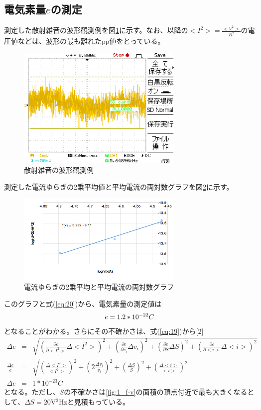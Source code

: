 \documentclass[11pt,a4j]{jsarticle}
\begin{document}
   \subsection{電気素量$e$の測定}
   
   測定した散射雑音の波形観測例を図\ref{fig:wave2}に示す。なお、以降の$<I^2> = \frac{<V^2>}{R^2}$の電圧値などは、波形の最も離れたpp値をとっている。
   
   \begin{figure}[htbp]
  \centering
  \includegraphics[width=8cm,clip]{A0000DS.png}
  \caption{散射雑音の波形観測例}
  \label{fig:wave2}
 \end{figure}%
   
   測定した電流ゆらぎの2乗平均値と平均電流の両対数グラフを図\ref{fig:3}に示す。
   \begin{figure}[htbp]
  \centering
  \includegraphics[width=8cm,clip]{3.png}
  \caption{電流ゆらぎの2乗平均と平均電流の両対数グラフ}
  \label{fig:3}
 \end{figure}%
   
   このグラフと式(\ref{eq:20})から、電気素量の測定値は
   \begin{equation}
   e = 1.2 * 10^{-22} C \nonumber \\
   \end{equation}
   となることがわかる。さらにその不確かさは、式(\ref{eq:19})から[2]
   \begin{eqnarray}
   \Delta e &=& \sqrt{(\frac{\partial e}{\partial <I^2>}\Delta <I^2>)^2 + (\frac{\partial e}{\partial v_i}\Delta v_i)^2 + (\frac{\partial e}{\partial S}\Delta S)^2 + (\frac{\partial e}{\partial <i>}\Delta <i>)^2 } \nonumber \\
   \frac{\Delta e}{e} &=& \sqrt{(\frac{\Delta <I^2>}{<I^2>})^2 + (2\frac{\Delta v_i}{v_i})^2 + (\frac{\Delta S}{S})^2 + (\frac{\Delta <i>}{<i>})^2} \nonumber \\
   \Delta e &=& 1 * 10^{-23} C \nonumber
   \end{eqnarray}
   となる。ただし、$S$の不確かさは\ref{fig:1_f-v}の面積の頂点付近で最も大きくなるとして、$\Delta S=20$V$^2$Hzと見積もっている。
   
\end{document}
